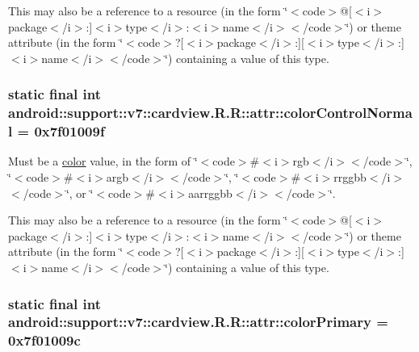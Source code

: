 This may also be a reference to a resource (in the form \char`\"{}$<$code$>$@\mbox{[}$<$i$>$package$<$/i$>$:\mbox{]}$<$i$>$type$<$/i$>$:$<$i$>$name$<$/i$>$$<$/code$>$\char`\"{}) or theme attribute (in the form \char`\"{}$<$code$>$?\mbox{[}$<$i$>$package$<$/i$>$:\mbox{]}\mbox{[}$<$i$>$type$<$/i$>$:\mbox{]}$<$i$>$name$<$/i$>$$<$/code$>$\char`\"{}) containing a value of this type. \hypertarget{classandroid_1_1support_1_1v7_1_1cardview_1_1_r_1_1attr_3d26617c821bec1a971f3524d13bd48c}{
\subsubsection[{colorControlNormal}]{\setlength{\rightskip}{0pt plus 5cm}static final int android::support::v7::cardview.R.R::attr::colorControlNormal = 0x7f01009f}}
\label{classandroid_1_1support_1_1v7_1_1cardview_1_1_r_1_1attr_3d26617c821bec1a971f3524d13bd48c}


Must be a \hyperlink{classandroid_1_1support_1_1v7_1_1cardview_1_1_r_1_1color}{color} value, in the form of \char`\"{}$<$code$>$\#$<$i$>$rgb$<$/i$>$$<$/code$>$\char`\"{}, \char`\"{}$<$code$>$\#$<$i$>$argb$<$/i$>$$<$/code$>$\char`\"{}, \char`\"{}$<$code$>$\#$<$i$>$rrggbb$<$/i$>$$<$/code$>$\char`\"{}, or \char`\"{}$<$code$>$\#$<$i$>$aarrggbb$<$/i$>$$<$/code$>$\char`\"{}. 

This may also be a reference to a resource (in the form \char`\"{}$<$code$>$@\mbox{[}$<$i$>$package$<$/i$>$:\mbox{]}$<$i$>$type$<$/i$>$:$<$i$>$name$<$/i$>$$<$/code$>$\char`\"{}) or theme attribute (in the form \char`\"{}$<$code$>$?\mbox{[}$<$i$>$package$<$/i$>$:\mbox{]}\mbox{[}$<$i$>$type$<$/i$>$:\mbox{]}$<$i$>$name$<$/i$>$$<$/code$>$\char`\"{}) containing a value of this type. \hypertarget{classandroid_1_1support_1_1v7_1_1cardview_1_1_r_1_1attr_757ff3bb29ecab552bcf0ad4f9ac7631}{
\subsubsection[{colorPrimary}]{\setlength{\rightskip}{0pt plus 5cm}static final int android::support::v7::cardview.R.R::attr::colorPrimary = 0x7f01009c}}
\label{classandroid_1_1support_1_1v7_1_1cardview_1_1_r_1_1attr_757ff3bb29ecab552bcf0ad4f9ac7631}


